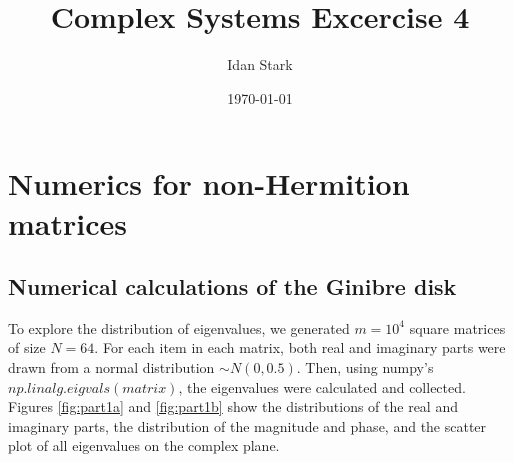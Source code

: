 \documentclass{article}
\title{Complex Systems Excercise 4}
\author{Idan Stark}
\date{\today}
\begin{document}
\maketitle

\section{Numerics for non-Hermition matrices}
\subsection{Numerical calculations of the Ginibre disk}
To explore the distribution of eigenvalues, we generated $m = 10^4$ square matrices of size $N = 64$. For each item in each matrix, both real and imaginary parts were drawn from a normal distribution $\sim N(0, 0.5)$. Then, using numpy's $np.linalg.eigvals(matrix)$, the eigenvalues were calculated and collected. Figures \ref{fig:part1a} and \ref{fig:part1b} show the distributions of the real and imaginary parts, the distribution of the magnitude and phase, and the scatter plot of all eigenvalues on the complex plane.
\end{document}
